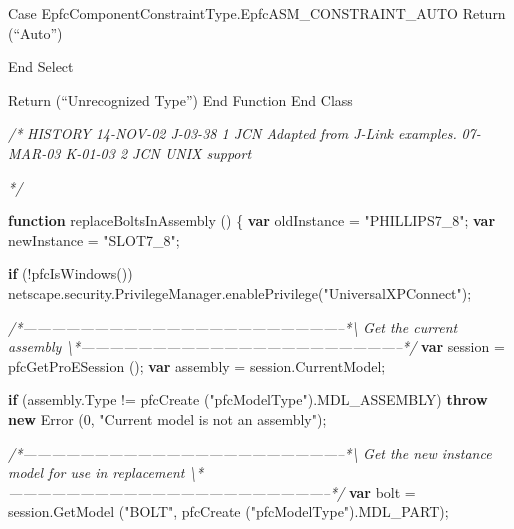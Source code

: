 \documentclass[]{article}
\newenvironment{Shaded}{}{}
\newcommand{\KeywordTok}[1]{\textcolor[rgb]{0.00,0.44,0.13}{\textbf{{#1}}}}
\newcommand{\DecValTok}[1]{\textcolor[rgb]{0.25,0.63,0.44}{{#1}}}
\newcommand{\StringTok}[1]{\textcolor[rgb]{0.25,0.44,0.63}{{#1}}}
\newcommand{\CommentTok}[1]{\textcolor[rgb]{0.38,0.63,0.69}{\textit{{#1}}}}
\newcommand{\OtherTok}[1]{\textcolor[rgb]{0.00,0.44,0.13}{{#1}}}
\newcommand{\FunctionTok}[1]{\textcolor[rgb]{0.02,0.16,0.49}{{#1}}}
\newcommand{\NormalTok}[1]{{#1}}
\begin{document}
Case EpfcComponentConstraintType.EpfcASM\_CONSTRAINT\_AUTO Return
(``Auto'')

End Select

Return (``Unrecognized Type'') End Function End Class

\begin{Shaded}
\begin{Highlighting}[]
\CommentTok{/*}
\CommentTok{   HISTORY}
\CommentTok{   }
\CommentTok{14-NOV-02   J-03-38   $$1   JCN      Adapted from J-Link examples.}
\CommentTok{07-MAR-03   K-01-03   $$2   JCN      UNIX support}

\CommentTok{*/}

\KeywordTok{function} \FunctionTok{replaceBoltsInAssembly} \NormalTok{()}
\NormalTok{\{}
  \KeywordTok{var} \NormalTok{oldInstance = }\StringTok{"PHILLIPS7_8"}\NormalTok{;}
  \KeywordTok{var} \NormalTok{newInstance = }\StringTok{"SLOT7_8"}\NormalTok{;}
  
  \KeywordTok{if} \NormalTok{(!}\FunctionTok{pfcIsWindows}\NormalTok{())}
    \OtherTok{netscape}\NormalTok{.}\OtherTok{security}\NormalTok{.}\OtherTok{PrivilegeManager}\NormalTok{.}\FunctionTok{enablePrivilege}\NormalTok{(}\StringTok{"UniversalXPConnect"}\NormalTok{);}

 \CommentTok{/*--------------------------------------------------------------------*\textbackslash{} }
\CommentTok{   Get the current assembly }
\CommentTok{ \textbackslash{}*--------------------------------------------------------------------*/}  
  \KeywordTok{var} \NormalTok{session = }\FunctionTok{pfcGetProESession} \NormalTok{();}
  \KeywordTok{var} \NormalTok{assembly = }\OtherTok{session}\NormalTok{.}\FunctionTok{CurrentModel}\NormalTok{;}
  
  \KeywordTok{if} \NormalTok{(}\OtherTok{assembly}\NormalTok{.}\FunctionTok{Type} \NormalTok{!= }\FunctionTok{pfcCreate} \NormalTok{(}\StringTok{"pfcModelType"}\NormalTok{).}\FunctionTok{MDL_ASSEMBLY}\NormalTok{)}
    \KeywordTok{throw} \KeywordTok{new} \FunctionTok{Error} \NormalTok{(}\DecValTok{0}\NormalTok{, }\StringTok{"Current model is not an assembly"}\NormalTok{);}
  
 \CommentTok{/*--------------------------------------------------------------------*\textbackslash{} }
\CommentTok{   Get the new instance model for use in replacement}
\CommentTok{ \textbackslash{}*--------------------------------------------------------------------*/}  
  \KeywordTok{var} \NormalTok{bolt = }\OtherTok{session}\NormalTok{.}\FunctionTok{GetModel} \NormalTok{(}\StringTok{"BOLT"}\NormalTok{, }\FunctionTok{pfcCreate} \NormalTok{(}\StringTok{"pfcModelType"}\NormalTok{).}\FunctionTok{MDL_PART}\NormalTok{);}
  

\end{Highlighting}
\end{Shaded}
\end{document}
